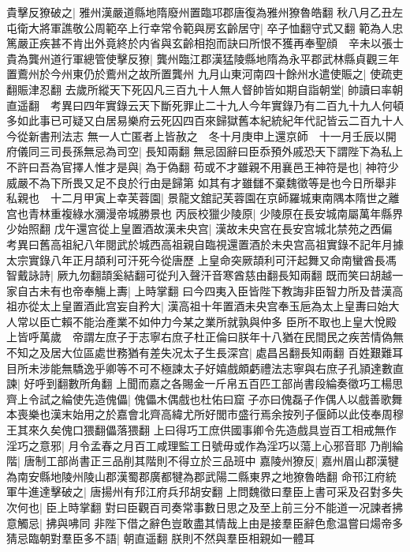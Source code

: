 貴擊反獠破之|{
	雅州漢嚴道縣地隋廢州置臨邛郡唐復為雅州獠魯皓翻}
秋八月乙丑左屯衛大將軍譙敬公周範卒上行幸常令範與房玄齡居守|{
	卒子恤翻守式又翻}
範為人忠篤嚴正疾甚不肯出外竟終於内省與玄齡相抱而訣曰所恨不獲再奉聖顔　辛未以張士貴為龔州道行軍總管使擊反獠|{
	龔州臨江郡漢猛陵縣地隋為永平郡武林縣貞觀三年置鷰州於今州東仍於鷰州之故所置龔州}
九月山東河南四十餘州水遣使賑之|{
	使疏吏翻賑津忍翻}
去歲所縱天下死囚凡三百九十人無人督帥皆如期自詣朝堂|{
	帥讀曰率朝直遥翻　考異曰四年實錄云天下斷死罪止二十九人今年實錄乃有二百九十九人何頓多如此事已可疑又白居易樂府云死囚四百來歸獄舊本紀統紀年代記皆云二百九十人今從新書刑法志}
無一人亡匿者上皆赦之　冬十月庚申上還京師　十一月壬辰以開府儀同三司長孫無忌為司空|{
	長知兩翻}
無忌固辭曰臣忝預外戚恐天下謂陛下為私上不許曰吾為官擇人惟才是與|{
	為于偽翻}
苟或不才雖親不用襄邑王神符是也|{
	神符少威嚴不為下所畏又足不良於行由是歸第}
如其有才雖讎不棄魏徵等是也今日所舉非私親也　十二月甲寅上幸芙蓉園|{
	景龍文舘記芙蓉園在京師羅城東南隅本隋世之離宫也青林重複綠水瀰漫帝城勝景也}
丙辰校獵少陵原|{
	少陵原在長安城南屬萬年縣界少始照翻}
戊午還宫從上皇置酒故漢未央宫|{
	漢故未央宫在長安宫城北禁苑之西偏　考異曰舊高祖紀八年閱武於城西高祖親自臨視還置酒於未央宫高祖實錄不記年月據太宗實錄八年正月頡利可汗死今從唐歷}
上皇命突厥頡利可汗起舞又命南蠻酋長馮智戴詠詩|{
	厥九勿翻頡奚結翻可從刋入聲汗音寒酋慈由翻長知兩翻}
既而笑曰胡越一家自古未有也帝奉觴上夀|{
	上時掌翻}
曰今四夷入臣皆陛下教誨非臣智力所及昔漢高祖亦從太上皇置酒此宫妄自矜大|{
	漢高祖十年置酒未央宫奉玉巵為太上皇夀曰始大人常以臣亡賴不能治產業不如仲力今某之業所就孰與仲多}
臣所不取也上皇大悅殿上皆呼萬歲　帝謂左庶子于志寧右庶子杜正倫曰朕年十八猶在民間民之疾苦情偽無不知之及居大位區處世務猶有差失况太子生長深宫|{
	處昌呂翻長知兩翻}
百姓艱難耳目所未涉能無驕逸乎卿等不可不極諫太子好嬉戲頗虧禮法志寧與右庶子孔頴達數直諫|{
	好呼到翻數所角翻}
上聞而嘉之各賜金一斤帛五百匹工部尚書段綸奏徵巧工楊思齊上令試之綸使先造傀儡|{
	傀儡木偶戲也杜佑曰窟子亦曰傀磊子作偶人以戲善歌舞本喪樂也漢末始用之於嘉會北齊高緯尤所好閭市盛行焉余按列子偃師以此伎奉周穆王其來久矣傀口猥翻儡落猥翻}
上曰得巧工庶供國事卿令先造戲具豈百工相戒無作淫巧之意邪|{
	月令孟春之月百工咸理監工日號毋或作為淫巧以蕩上心邪音耶}
乃削綸階|{
	唐制工部尚書正三品削其階則不得立於三品班中}
嘉陵州獠反|{
	嘉州眉山郡漢犍為南安縣地陵州陵山郡漢蜀郡廣都犍為郡武陽二縣東界之地獠魯皓翻}
命邗江府統軍牛進達擊破之|{
	唐揚州有䢴江府兵䢴胡安翻}
上問魏徵曰羣臣上書可采及召對多失次何也|{
	臣上時掌翻}
對曰臣觀百司奏常事數日思之及至上前三分不能道一况諫者拂意觸忌|{
	拂與咈同}
非陛下借之辭色豈敢盡其情哉上由是接羣臣辭色愈温嘗曰煬帝多猜忌臨朝對羣臣多不語|{
	朝直遥翻}
朕則不然與羣臣相親如一體耳

